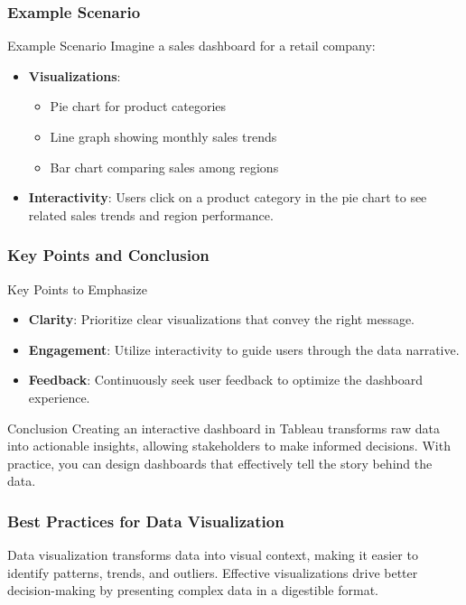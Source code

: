 \documentclass[aspectratio=169]{beamer}
\begin{document}
\begin{frame}[fragile]
    \frametitle{Example Scenario}
    \begin{block}{Example Scenario}
        Imagine a sales dashboard for a retail company:
        \begin{itemize}
            \item \textbf{Visualizations}: 
            \begin{itemize}
                \item Pie chart for product categories
                \item Line graph showing monthly sales trends
                \item Bar chart comparing sales among regions
            \end{itemize}
            \item \textbf{Interactivity}: Users click on a product category in the pie chart to see related sales trends and region performance.
        \end{itemize}
    \end{block}
\end{frame}

\begin{frame}[fragile]
    \frametitle{Key Points and Conclusion}
    \begin{block}{Key Points to Emphasize}
        \begin{itemize}
            \item \textbf{Clarity}: Prioritize clear visualizations that convey the right message.
            \item \textbf{Engagement}: Utilize interactivity to guide users through the data narrative.
            \item \textbf{Feedback}: Continuously seek user feedback to optimize the dashboard experience.
        \end{itemize}
    \end{block}
    
    \begin{block}{Conclusion}
        Creating an interactive dashboard in Tableau transforms raw data into actionable insights, allowing stakeholders to make informed decisions.
        With practice, you can design dashboards that effectively tell the story behind the data.
    \end{block}
\end{frame}

\begin{frame}[fragile]
    \frametitle{Best Practices for Data Visualization}
    Data visualization transforms data into visual context, making it easier to identify patterns, trends, and outliers. 
    Effective visualizations drive better decision-making by presenting complex data in a digestible format.
\end{frame}
\end{document}
